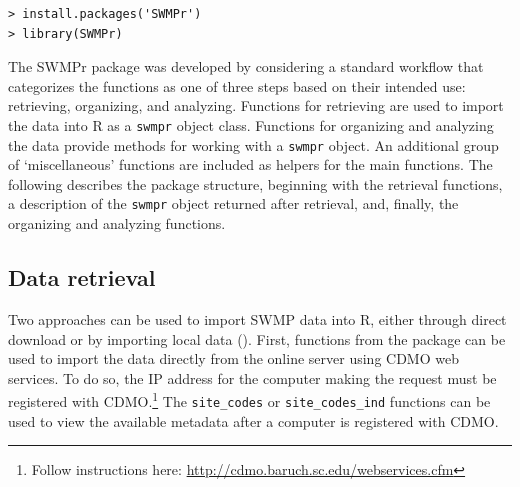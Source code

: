 \documentclass[10pt,letterpaper]{article}\usepackage[]{graphicx}\usepackage[]{color}
\makeatletter
\newenvironment{kframe}{%
 \def\at@end@of@kframe{}%
 \ifinner\ifhmode%
  \def\at@end@of@kframe{\end{minipage}}%
  \begin{minipage}{\columnwidth}%
 \fi\fi%
 \def\FrameCommand##1{\hskip\@totalleftmargin \hskip-\fboxsep
 \colorbox{shadecolor}{##1}\hskip-\fboxsep
     \hskip-\linewidth \hskip-\@totalleftmargin \hskip\columnwidth}%
 \MakeFramed {\advance\hsize-\width
   \@totalleftmargin\z@ \linewidth\hsize
   \@setminipage}}%
 {\par\unskip\endMakeFramed%
 \at@end@of@kframe}
\newenvironment{knitrout}{}{} %
\makeatother
\begin{document}
\begin{knitrout}\small
{}\color{fgcolor}\begin{kframe}
\begin{verbatim}
> install.packages('SWMPr')
> library(SWMPr)
\end{verbatim}
\end{kframe}
\end{knitrout}


The SWMPr package was developed by considering a standard workflow that categorizes the functions as one of three steps based on their intended use: retrieving, organizing, and analyzing.  Functions for retrieving are used to import the data into R as a \texttt{swmpr} object class.  Functions for organizing and analyzing the data provide methods for working with a \texttt{swmpr} object.  An additional group of `miscellaneous' functions are included as helpers for the main functions.  The following describes the package structure, beginning with the retrieval functions, a description of the \texttt{swmpr} object returned after retrieval, and, finally, the organizing and analyzing functions.

\subsection*{Data retrieval}

Two approaches can be used to import \ac{SWMP} data into R, either through direct download or by importing local data (). First, functions from the package can be used to import the data directly from the online server using \ac{CDMO} web services. To do so, the IP address for the computer making the request must be registered with \ac{CDMO}.\footnote{Follow instructions here: \url{http://cdmo.baruch.sc.edu/webservices.cfm}}  The \texttt{site\_codes} or \texttt{site\_codes\_ind} functions can be used to view the available metadata after a computer is registered with \ac{CDMO}. 
\end{document}
